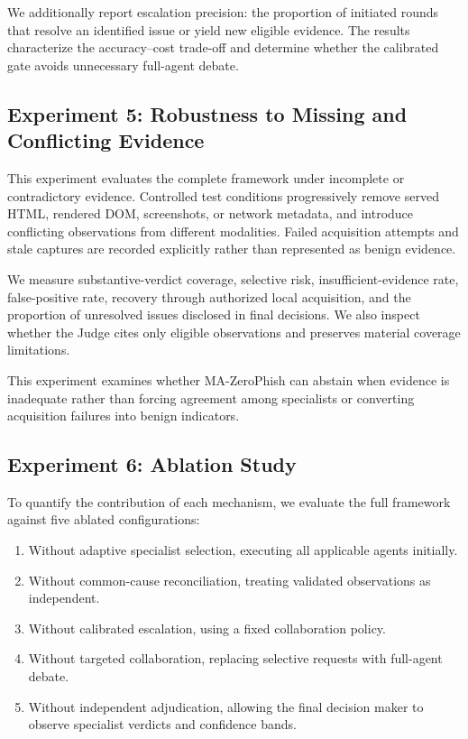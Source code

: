 We additionally report escalation
precision: the proportion of
initiated rounds that resolve an
identified issue or yield new
eligible evidence. The results
characterize the accuracy--cost
trade-off and determine whether
the calibrated gate avoids
unnecessary full-agent debate.

\subsection{Experiment 5: Robustness
to Missing and Conflicting Evidence}
\label{sec:exp5}

This experiment evaluates the complete
framework under incomplete or
contradictory evidence. Controlled
test conditions progressively remove
served HTML, rendered DOM, screenshots,
or network metadata, and introduce
conflicting observations from
different modalities. Failed
acquisition attempts and stale
captures are recorded explicitly
rather than represented as benign
evidence.

We measure substantive-verdict
coverage, selective risk,
insufficient-evidence rate,
false-positive rate, recovery
through authorized local acquisition,
and the proportion of unresolved
issues disclosed in final decisions.
We also inspect whether the Judge
cites only eligible observations
and preserves material coverage
limitations.

This experiment examines whether
MA-ZeroPhish can abstain when
evidence is inadequate rather than
forcing agreement among specialists
or converting acquisition failures
into benign indicators.

\subsection{Experiment 6: Ablation Study}
\label{sec:exp6}

To quantify the contribution of
each mechanism, we evaluate the
full framework against five
ablated configurations:
\begin{enumerate}
\item Without adaptive specialist
selection, executing all applicable
agents initially.
\item Without common-cause
reconciliation, treating validated
observations as independent.
\item Without calibrated escalation,
using a fixed collaboration policy.
\item Without targeted collaboration,
replacing selective requests with
full-agent debate.
\item Without independent
adjudication, allowing the final
decision maker to observe specialist
verdicts and confidence bands.
\end{enumerate}

